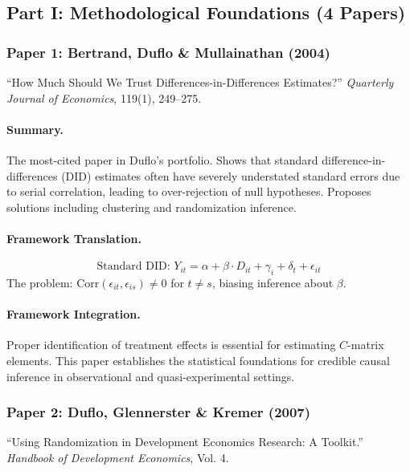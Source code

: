 \subsection{Part I: Methodological Foundations (4 Papers)}

\subsubsection{Paper 1: Bertrand, Duflo \& Mullainathan (2004)}

``How Much Should We Trust Differences-in-Differences Estimates?''
\textit{Quarterly Journal of Economics}, 119(1), 249--275.

\paragraph{Summary.}
The most-cited paper in Duflo's portfolio. Shows that standard difference-in-differences
(DID) estimates often have severely understated standard errors due to serial correlation,
leading to over-rejection of null hypotheses. Proposes solutions including clustering and
randomization inference.

\paragraph{Framework Translation.}
\begin{equation}
  \text{Standard DID: } Y_{it} = \alpha + \beta \cdot D_{it} + \gamma_i + \delta_t + \epsilon_{it}
\end{equation}
The problem: $\text{Corr}(\epsilon_{it}, \epsilon_{is}) \neq 0$ for $t \neq s$, biasing inference about $\beta$.

\paragraph{Framework Integration.}
Proper identification of treatment effects is essential for estimating $C$-matrix elements.
This paper establishes the statistical foundations for credible causal inference in
observational and quasi-experimental settings.

\subsubsection{Paper 2: Duflo, Glennerster \& Kremer (2007)}

``Using Randomization in Development Economics Research: A Toolkit.''
\textit{Handbook of Development Economics}, Vol. 4.

